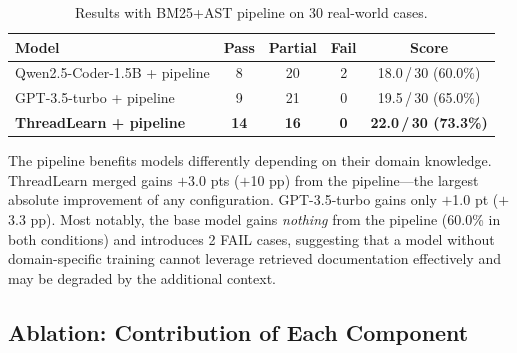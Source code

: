 \documentclass[runningheads]{llncs}
\begin{document}
\begin{table}[H]
  \centering
  \caption{Results with BM25+AST pipeline on 30 real-world cases.}
  \label{tab:pipeline}
  \begin{tabular}{@{}lcccc@{}}
    \toprule
    \textbf{Model} & \textbf{Pass} & \textbf{Partial} & \textbf{Fail} & \textbf{Score} \\
    \midrule
    Qwen2.5-Coder-1.5B + pipeline  & 8  & 20 & 2 & 18.0\,/\,30 (60.0\%) \\
    GPT-3.5-turbo + pipeline        & 9  & 21 & 0 & 19.5\,/\,30 (65.0\%) \\
    \textbf{ThreadLearn + pipeline} & \textbf{14} & \textbf{16} & \textbf{0} &
      \textbf{22.0\,/\,30 (73.3\%)} \\
    \bottomrule
  \end{tabular}
\end{table}

The pipeline benefits models differently depending on their domain
knowledge.
ThreadLearn merged gains $+$3.0 pts ($+$10 pp) from the pipeline---the
largest absolute improvement of any configuration.
GPT-3.5-turbo gains only $+$1.0 pt ($+$3.3 pp).
Most notably, the base model gains \emph{nothing} from the pipeline
(60.0\% in both conditions) and introduces 2 FAIL cases, suggesting
that a model without domain-specific training cannot leverage retrieved
documentation effectively and may be degraded by the additional context.

\subsection{Ablation: Contribution of Each Component}
\label{sec:eval:ablation}
\end{document}
